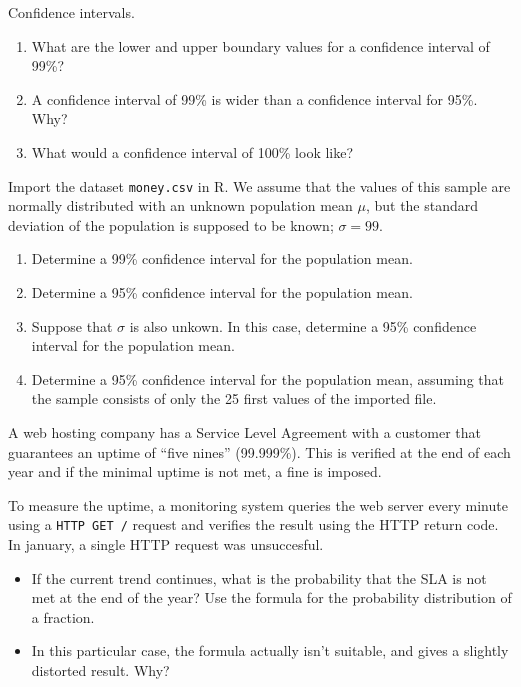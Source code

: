 \begin{exercise}
  Confidence intervals.
  
  \begin{enumerate}
    \item What are the lower and upper boundary values for a confidence interval of 99\%?
    \item A confidence interval of 99\% is wider than a confidence interval for 95\%. Why?
    \item What would a confidence interval of 100\% look like?
  \end{enumerate}
  
\end{exercise}

\begin{exercise}
  \label{ex:confidence-money}
  
  Import the dataset \texttt{money.csv} in R. 
  We assume that the values of this sample are normally distributed with 
  an unknown population mean $\mu$, but the standard deviation of the population
  is supposed to be known; $\sigma = 99$. 
  
  \begin{enumerate}
    \item Determine a 99\% confidence interval for the population mean.
    \item Determine a 95\% confidence interval for the population mean.
    \item Suppose that $\sigma$ is also unkown. In this case, determine a 95\% confidence interval for the population mean.
    \item Determine a 95\% confidence interval for the population mean, assuming that the sample consists of only the 25 first values of the imported file.
  \end{enumerate}
\end{exercise}

\begin{exercise}
  A web hosting company has a Service Level Agreement with a customer that guarantees an uptime of ``five nines'' (99.999\%). 
  This is verified at the end of each year and if the minimal uptime is not met, a fine is imposed.

  To measure the uptime, a monitoring system queries the web server every minute using a \texttt{HTTP GET /} request and verifies the result using the HTTP return code. 
  In january, a single HTTP request was unsuccesful.

  \begin{itemize}
    \item If the current trend continues, what is the probability that the SLA is not met at the end of the year? Use the formula for the probability distribution of a fraction.
    \item In this particular case, the formula actually isn't suitable, and gives a slightly distorted result. Why?
  \end{itemize}
\end{exercise}






